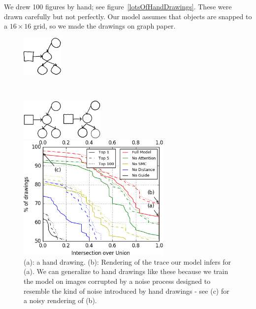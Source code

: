 \documentclass{article}
\begin{document}
We drew 100 figures by hand; see figure~\ref{lotsOfHandDrawings}.
These were drawn carefully but not perfectly.
Our model assumes that objects are snapped to a $16\times 16$ grid, so
we made the drawings on graph paper.
\begin{figure}\centering
  \begin{minipage}{0.35\textwidth}
  \begin{minipage}[t]{\textwidth}\centering\includegraphics[width = 2cm]{figures/expert-60-reduced.png}
    \subcaption{}
  \end{minipage}\\
   \begin{minipage}[t]{0.5\textwidth}\includegraphics[width = 2cm]{figures/60-groundTruth-reduced.png}
    \subcaption{}
  \end{minipage}%
  \begin{minipage}[t]{0.5\textwidth}\includegraphics[width = 2cm]{figures/60-1-reduced.png}
    \subcaption{}
  \end{minipage}%
    \caption{(a): a hand drawing. (b): Rendering of the trace our model infers for (a). We can generalize to hand drawings like these because we train the model on images corrupted by a noise process designed to resemble the kind of noise introduced by hand drawings - see (c) for a noisy rendering of (b).}\label{handDrawingExamples}
  \end{minipage}\hfill
  \begin{minipage}{0.6\textwidth} 
  \includegraphics[width = 7.5cm]{figures/drawingAccuracy.png}

\end{minipage}
\end{figure}
\end{document}
